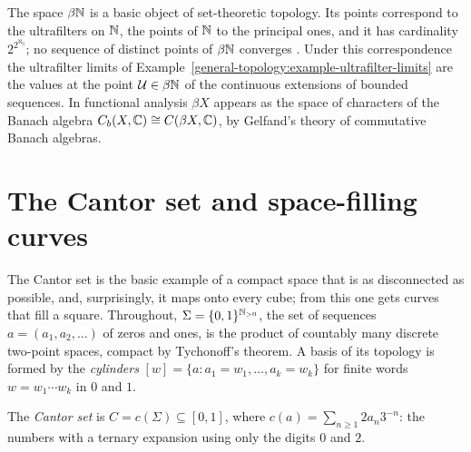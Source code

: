 \begin{remark}\label{general-topology:remark-beta-n}
The space $\beta\mathbb{N}$ is a basic object of set-theoretic topology. Its points correspond to the ultrafilters on $\mathbb{N}$, the points of $\mathbb{N}$ to the principal ones, and it has cardinality $2^{2^{\aleph_0}}$; no
sequence of distinct points of $\beta\mathbb{N}$ converges \cite{engelking-general-topology}. Under this correspondence the ultrafilter limits of Example~\ref{general-topology:example-ultrafilter-limits} are the
values at the point $\mathcal{U} \in \beta\mathbb{N}$ of the continuous extensions of bounded sequences. In functional analysis $\beta X$ appears as the space of characters of the Banach algebra
$C_b(X, \mathbb{C}) \cong C(\beta X, \mathbb{C})$, by Gelfand's theory of commutative Banach algebras.
\end{remark}

\section{The Cantor set and space-filling curves}\label{general-topology:section-cantor}

The Cantor set is the basic example of a compact space that is as disconnected as possible, and, surprisingly, it maps onto every cube; from this one gets curves that fill a square. Throughout,
$\Sigma = \{0, 1\}^{\mathbb{N}_{>0}}$, the set of sequences $a = (a_1, a_2, \ldots)$ of zeros and ones, is the product of countably many discrete two-point spaces, compact by Tychonoff's theorem. A basis of its
topology is formed by the \emph{cylinders} $[w] = \{a : a_1 = w_1, \ldots, a_k = w_k\}$ for finite words $w = w_1 \cdots w_k$ in $0$ and $1$.

\begin{definition}\label{general-topology:definition-cantor-set}
The \emph{Cantor set} is $C = c(\Sigma) \subseteq [0, 1]$, where $c(a) = \sum_{n \geq 1}2a_n3^{-n}$: the numbers with a ternary expansion using only the digits $0$ and $2$.
\end{definition}

